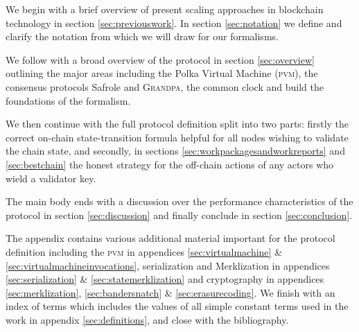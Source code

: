 We begin with a brief overview of present scaling approaches in blockchain technology in section \ref{sec:previouswork}. In section \ref{sec:notation} we define and clarify the notation from which we will draw for our formalisms.

We follow with a broad overview of the protocol in section \ref{sec:overview} outlining the major areas including the Polka Virtual Machine (\textsc{pvm}), the consensus protocols Safrole and \textsc{Grandpa}, the common clock and build the foundations of the formalism.

We then continue with the full protocol definition split into two parts: firstly the correct on-chain state-transition formula helpful for all nodes wishing to validate the chain state, and secondly, in sections \ref{sec:workpackagesandworkreports} and \ref{sec:bestchain} the honest strategy for the off-chain actions of any actors who wield a validator key.

The main body ends with a discussion over the performance characteristics of the protocol in section \ref{sec:discussion} and finally conclude in section \ref{sec:conclusion}.

The appendix contains various additional material important for the protocol definition including the \textsc{pvm} in appendices \ref{sec:virtualmachine} \& \ref{sec:virtualmachineinvocations}, serialization and Merklization in appendices \ref{sec:serialization} \& \ref{sec:statemerklization} and cryptography in appendices \ref{sec:merklization}, \ref{sec:bandersnatch} \& \ref{sec:erasurecoding}. We finish with an index of terms which includes the values of all simple constant terms used in the work in appendix \ref{sec:definitions}, and close with the bibliography.
